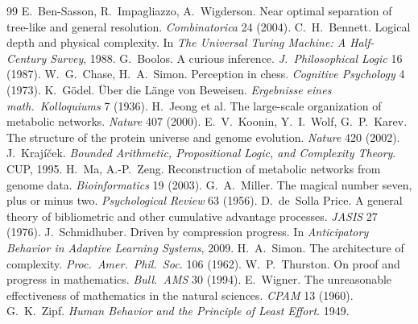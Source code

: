 \documentclass[11pt]{article}
\begin{document}
\begin{thebibliography}{99}\small
{} E.~Ben-Sasson, R.~Impagliazzo, A.~Wigderson. Near optimal separation of tree-like and general resolution. \emph{Combinatorica} 24 (2004).
 C.~H.~Bennett. Logical depth and physical complexity. In \emph{The Universal Turing Machine: A Half-Century Survey}, 1988.
 G.~Boolos. A curious inference. \emph{J.\ Philosophical Logic} 16 (1987).
 W.~G.~Chase, H.~A.~Simon. Perception in chess. \emph{Cognitive Psychology} 4 (1973).
 K.~G\"odel. \"Uber die L\"ange von Beweisen. \emph{Ergebnisse eines math.\ Kolloquiums} 7 (1936).
 H.~Jeong et al. The large-scale organization of metabolic networks. \emph{Nature} 407 (2000).
 E.~V.~Koonin, Y.~I.~Wolf, G.~P.~Karev. The structure of the protein universe and genome evolution. \emph{Nature} 420 (2002).
 J.~Kraj\'i\v{c}ek. \emph{Bounded Arithmetic, Propositional Logic, and Complexity Theory}. CUP, 1995.
 H.~Ma, A.-P.~Zeng. Reconstruction of metabolic networks from genome data. \emph{Bioinformatics} 19 (2003).
 G.~A.~Miller. The magical number seven, plus or minus two. \emph{Psychological Review} 63 (1956).
 D.~de~Solla Price. A general theory of bibliometric and other cumulative advantage processes. \emph{JASIS} 27 (1976).
 J.~Schmidhuber. Driven by compression progress. In \emph{Anticipatory Behavior in Adaptive Learning Systems}, 2009.
 H.~A.~Simon. The architecture of complexity. \emph{Proc.\ Amer.\ Phil.\ Soc.} 106 (1962).
 W.~P.~Thurston. On proof and progress in mathematics. \emph{Bull.\ AMS} 30 (1994).
 E.~Wigner. The unreasonable effectiveness of mathematics in the natural sciences. \emph{CPAM} 13 (1960).
 G.~K.~Zipf. \emph{Human Behavior and the Principle of Least Effort}. 1949.
\end{thebibliography}
\end{document}
